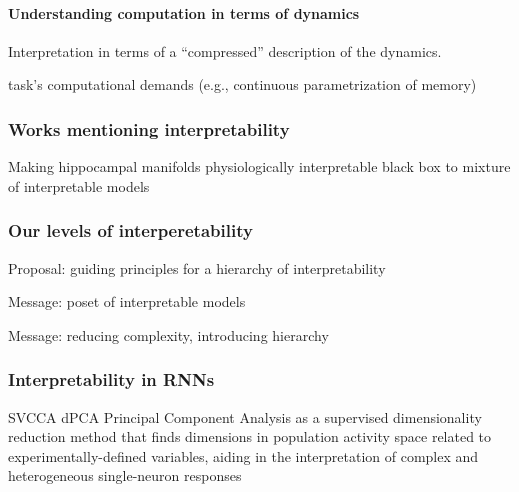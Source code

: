 \documentclass{article}
\theoremstyle{definition} \newtheorem{definition}{Definition}  \newtheorem{example}{Example}
\theoremstyle{remark} \newtheorem{remark}{Remark}
\newcounter{ct}
\begin{document}
\paragraph{Understanding computation in terms of dynamics}
Interpretation in terms of a ``compressed'' description of the dynamics.

task's computational demands (e.g., continuous parametrization of memory)



\subsubsection{Works mentioning interpretability}
\citep{whiteway2019interpretable}
\citep{kar2022interpretability}
 Making hippocampal manifolds physiologically interpretable \citep{esparza2023interpretable}
black box to mixture of interpretable models \citep{ghosh2023blackbox}
\citep{schneider2023learnable}
\citep{brenner2024almost}
\citep{menier2025interpretable}
\citep{nonnenmacher2017extracting}

\subsubsection{Our levels of interperetability}
Proposal: guiding principles for a hierarchy of interpretability


Message: poset of interpretable models

Message: reducing complexity, introducing hierarchy 
\citep{Vermani2025b}
\citep{geadah2024parsing, geadah2025modeling}


\subsubsection{Interpretability in RNNs}
SVCCA\citep{raghu2017svcca}
dPCA\citep{kobak2016demixed} Principal Component Analysis as a supervised dimensionality reduction method that finds dimensions in population activity space related to experimentally-defined variables, aiding in the interpretation of complex and heterogeneous single-neuron responses
\end{document}
